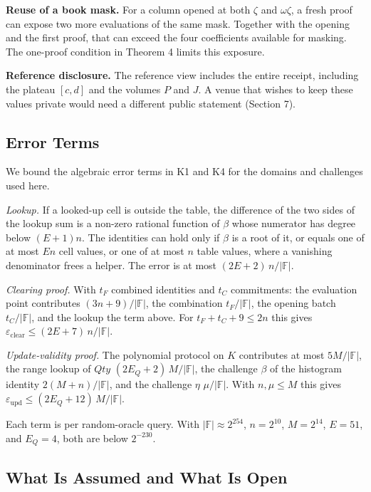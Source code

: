 \textbf{Reuse of a book mask.} For a column opened at both \(\zeta\) and \(\omega\zeta\), a fresh proof can expose two more evaluations of the same mask. Together with the opening and the first proof, that can exceed the four coefficients available for masking. The one-proof condition in Theorem 4 limits this exposure.

\textbf{Reference disclosure.} The reference view includes the entire receipt, including the plateau \([c,d]\) and the volumes \(P\) and \(J\). A venue that wishes to keep these values private would need a different public statement (Section 7).

\subsection{Error Terms}

We bound the algebraic error terms in K1 and K4 for the domains and challenges used here.

\emph{Lookup.} If a looked-up cell is outside the table, the difference of the two sides of the lookup sum is a non-zero rational function of \(\beta\) whose numerator has degree below \((E+1)n\). The identities can hold only if \(\beta\) is a root of it, or equals one of at most \(En\) cell values, or one of at most \(n\) table values, where a vanishing denominator frees a helper. The error is at most \((2E+2)\,n/|\mathbb{F}|\).

\emph{Clearing proof.} With \(t_F\) combined identities and \(t_C\) commitments: the evaluation point contributes \((3n+9)/|\mathbb{F}|\), the combination \(t_F/|\mathbb{F}|\), the opening batch \(t_C/|\mathbb{F}|\), and the lookup the term above. For \(t_F + t_C + 9 \le 2n\) this gives \(\varepsilon_{\mathrm{clear}} \le (2E+7)\,n/|\mathbb{F}|\).

\emph{Update-validity proof.} The polynomial protocol on \(K\) contributes at most \(5M/|\mathbb{F}|\), the range lookup of \(Qty\) \((2E_Q+2)\,M/|\mathbb{F}|\), the challenge \(\beta\) of the histogram identity \(2(M+n)/|\mathbb{F}|\), and the challenge \(\eta\) \(\mu/|\mathbb{F}|\). With \(n, \mu \le M\) this gives \(\varepsilon_{\mathrm{upd}} \le (2E_Q+12)\,M/|\mathbb{F}|\).

Each term is per random-oracle query. With \(|\mathbb{F}| \approx 2^{254}\), \(n = 2^{10}\), \(M = 2^{14}\), \(E = 51\), and \(E_Q = 4\), both are below \(2^{-230}\).

\subsection{What Is Assumed and What Is Open}

